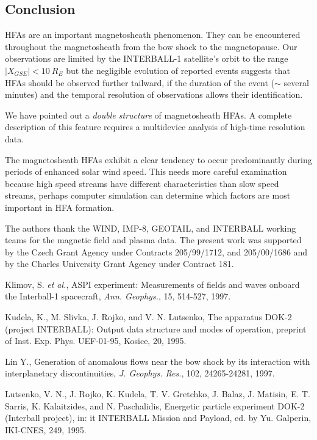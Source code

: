 \documentclass{article}
\begin{document}
\begin{article}
\section{Conclusion}
HFAs are an important magnetosheath phenomenon.
They can be encountered throughout the
magnetosheath from the bow shock to the magnetopause. Our
observations are limited by the INTERBALL-1 satellite's orbit to the
range $|X_{GSE}| < 10\> R_E$ but the negligible evolution of reported
events suggests that HFAs should be observed further tailward, if the
duration of the event ($\sim$ several minutes) and the temporal
resolution of observations allows their identification.

We have pointed out a {\it double structure} of magnetosheath
HFAs. A complete description of this feature requires a
multidevice analysis of high-time resolution data.

The magnetosheath HFAs exhibit a clear tendency to occur
predominantly during periods of enhanced solar wind speed.
This needs more careful examination because high speed streams
have different characteristics than slow speed streams,
perhaps computer simulation can determine which factors are
most important in HFA formation.

\acknowledgments %
{The authors thank the WIND, IMP-8, GEOTAIL, and INTERBALL working
teams for the
magnetic field and plasma data. The  present  work  was  supported by
the Czech  Grant  Agency  under  Contracts  205/99/1712, and
205/00/1686 and by the Charles University Grant Agency under
Contract 181.}

\begin{references}

{}
Klimov, S. {\it et al.}, ASPI experiment: Measurements of fields and
waves onboard the Interball-1 spacecraft, {\it Ann. Geophys.}, 15,
514-527, 1997.

Kudela, K., M. Slivka, J. Rojko, and V. N. Lutsenko, The
apparatus DOK-2 (project INTERBALL): Output data structure and
modes of operation, preprint of Inst. Exp. Phys. UEF-01-95,
Kosice, 20, 1995.

Lin Y., Generation of anomalous flows near the bow shock by
its interaction with interplanetary discontinuities, {\it J. Geophys.
Res.}, 102, 24265-24281, 1997.

Lutsenko, V. N., J. Rojko, K. Kudela, T. V. Gretchko, J. Balaz,
J. Matisin, E. T. Sarris, K. Kalaitzides, and N. Paschalidis,
Energetic particle experiment DOK-2 (Interball project), in:
{it INTERBALL Mission and Payload,} ed. by Yu. Galperin, IKI-CNES,
249, 1995.


\end{references}
\end{article}
\end{document}
